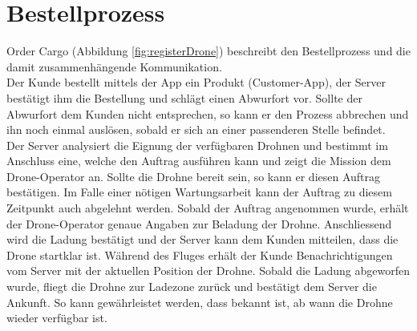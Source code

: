 {\section{Bestellprozess}

Order Cargo (Abbildung \ref{fig:registerDrone}) beschreibt den Bestellprozess und die damit zusammenhängende Kommunikation. \\

Der Kunde bestellt mittels der App ein Produkt (Customer-App), der Server bestätigt ihm die Bestellung und schlägt einen Abwurfort vor. Sollte der Abwurfort dem Kunden nicht entsprechen, so kann er den Prozess abbrechen und ihn noch einmal auslösen, sobald er sich an einer passenderen Stelle befindet.\\

Der Server analysiert die Eignung der verfügbaren Drohnen und bestimmt im Anschluss eine, welche den Auftrag ausführen kann und zeigt die Mission dem Drone-Operator an. Sollte die Drohne bereit sein, so kann er diesen Auftrag bestätigen. Im Falle einer nötigen Wartungsarbeit kann der Auftrag zu diesem Zeitpunkt auch abgelehnt werden. Sobald der Auftrag angenommen wurde, erhält der Drone-Operator genaue Angaben zur Beladung der Drohne. Anschliessend wird die Ladung bestätigt und der Server kann dem Kunden mitteilen, dass die Drone startklar ist. Während des Fluges erhält der Kunde Benachrichtigungen vom Server mit der aktuellen Position der Drohne. Sobald die Ladung abgeworfen wurde, fliegt die Drohne zur Ladezone zurück und bestätigt dem Server die Ankunft. So kann gewährleistet werden, dass bekannt ist, ab wann die Drohne wieder verfügbar ist. \\

}
